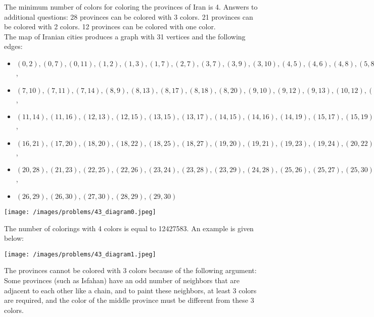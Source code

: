 \begin{solution}
The minimum number of colors for coloring the provinces of Iran is 4. Answers to additional questions: 28 provinces can be colored with 3 colors. 21 provinces can be colored with 2 colors. 12 provinces can be colored with one color. \\[0.2cm]

The map of Iranian cities produces a graph with 31 vertices and the following edges:

\begin{itemize}
	\item $(0, 2), (0, 7), (0, 11), (1, 2), (1, 3), (1, 7), (2, 7), (3, 7), ( 3, 9), (3, 10), (4, 5), (4, 6), (4, 8), (5, 8), (5, 9), (6, 8), (6, 18)$,
	\item $(7, 10), (7, 11), (7, 14), (8, 9), (8, 13), (8, 17), (8, 18), (8, 20) , (9, 10), (9, 12), (9, 13), (10, 12), (10, 14), (10, 15)$, 
	\item $ (11, 14), (11, 16), ( 12, 13), (12, 15), (13, 15), (13, 17), (14, 15), (14, 16), (14, 19), (15, 17), (15, 19), (15, 20), (16, 19)$,
	\item $(16, 21), (17, 20), (18, 20), (18, 22), (18, 25), (18, 27) , (19, 20), (19, 21), (19, 23), (19, 24),(20, 22), (20, 24), (20, 26)$,
	\item $(20, 28), ( 21, 23), (22, 25), (22, 26), (23, 24), (23, 28), (23, 29), (24, 28), (25, 26), (25, 27), (25, 30), (26, 28)$,
	\item $(26, 29), (26, 30), (27, 30), (28, 29), (29, 30)$
\end{itemize}  

\begin{center}
	\texttt{[image: /images/problems/43\_diagram0.jpeg]}
\end{center}

The number of colorings with 4 colors is equal to 12427583. An example is given below:

\begin{center}
	\texttt{[image: /images/problems/43\_diagram1.jpeg]}
\end{center}

The provinces cannot be colored with 3 colors because of the following argument: Some provinces (such as Isfahan) have an odd number of neighbors that are adjacent to each other like a chain, and to paint these neighbors, at least 3 colors are required, and the color of the middle province must be different from these 3 colors.\\[0.2cm]


\end{solution}
